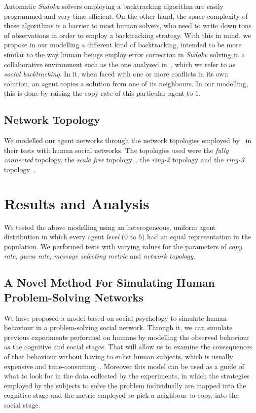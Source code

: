 \documentclass{article}
\begin{document}
Automatic {\em Sudoku} solvers employing a backtracking algorithm are easily programmed and very time-efficient. On the other hand, the space complexity of these algorithms is a barrier to most human solvers, who need to write down tons of observations in order to employ a backtracking strategy. With this in mind, we propose in our modelling a different kind of backtracking, intended to be more similar to the way human beings employ error correction in {\em Sudoku} solving in a collaborative environment such as the one analysed in~\cite{farenzena:collabem}, which we refer to as \emph{social backtracking}. In it, when faced with one or more conflicts in its own solution, an agent copies a solution from one of its neighbours. In our modelling, this is done by raising the copy rate of this particular agent to $1$.

\subsection{Network Topology}

We modelled our agent networks through the network topologies employed by~\cite{farenzena:collabem} in their tests with human social networks. The topologies used were the {\em fully connected} topology, the {\em scale free} topology~\cite{barabasi:linked}, the {\em ring-2} topology and the {\em ring-3} topology~\cite{newman:newtorks}.

\section{Results and Analysis}

We tested the above modelling using an heterogeneous, uniform agent distribution in which every agent {\em level} ($0$ to $5$) %
had an equal representation in the population. We performed tests with varying values for the parameters of {\em copy rate}, {\em guess rate}, {\em message selecting metric} and {\em network topology}.

\subsection{A Novel Method For Simulating Human Problem-Solving Networks}

We have proposed a model based on social psychology to simulate human behaviour in a problem-solving social network. Through it, we can simulate previous experiments performed on humans by modelling the observed behaviour as the cognitive and social stages. That will allow us to examine the consequences of that behaviour without having to enlist human subjects, which is usually expensive and time-consuming~\cite{?}. Moreover this model can be used as a guide of what to look for in the data collected by the experiments, in which the strategies employed by the subjects to solve the problem individually are mapped into the cognitive stage and the metric employed to pick a neighbour to copy, into the social stage.
\end{document}
